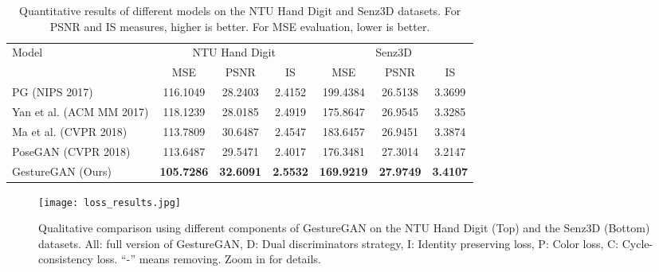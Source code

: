 \documentclass[sigconf]{acmart}
\begin{document}
\begin{table*}[!t] \small
	\centering
	\vspace{-0.2cm}
	\caption{Quantitative results of different models on the NTU Hand Digit and Senz3D datasets. For PSNR and IS measures, higher is better. For MSE evaluation, lower is better.}
	\begin{tabular}{l|c|c|c|c|c|c} \toprule
		\multirow{2}{*}{Model} & \multicolumn{3}{c|}{NTU Hand Digit \cite{liu2016deepfashion}}& \multicolumn{3}{c}{Senz3D \cite{memo2016head}}   \\ \cline{2-7}
		& MSE               & PSNR             & IS              & MSE               & PSNR             & IS     \\ \midrule			
		PG \cite{ma2017pose}  (NIPS 2017)                                        & 116.1049          & 28.2403          & 2.4152          & 199.4384          & 26.5138          & 3.3699 \\ \hline
		Yan et al. \cite{yan2017skeleton} (ACM MM 2017)                              & 118.1239          & 28.0185          & 2.4919          & 175.8647          & 26.9545          & 3.3285 \\ \hline
		Ma et al. \cite{ma2017disentangled} (CVPR 2018)                              & 113.7809          & 30.6487          & 2.4547          & 183.6457          & 26.9451          & 3.3874 \\ \hline 
		PoseGAN \cite{siarohin2017deformable} (CVPR 2018)                            & 113.6487          & 29.5471          & 2.4017          & 176.3481          & 27.3014          & 3.2147 \\ \hline \hline
		GestureGAN (Ours)                                                            & \textbf{105.7286} & \textbf{32.6091} & \textbf{2.5532 }         & \textbf{169.9219} & \textbf{27.9749}          & \textbf{3.4107} \\ \bottomrule		
	\end{tabular}
	\label{tab:baseline}
	\vspace{-0.2cm}
\end{table*}

\begin{figure*}[!t] \tiny
	\centering
	\texttt{[image: loss\_results.jpg]}
	\caption{Qualitative comparison using different components of GestureGAN on the NTU Hand Digit (Top) and the Senz3D (Bottom) datasets.  All: full version of GestureGAN, D: Dual discriminators strategy, I: Identity preserving loss, P: Color loss, C: Cycle-consistency loss. ``-'' means removing. Zoom in for details.}
	\label{fig:loss}
\end{figure*}
\end{document}
